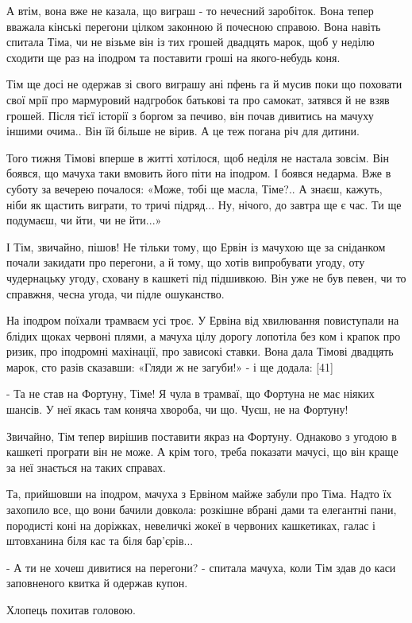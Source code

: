 А втім, вона вже не казала, що виграш - то нечесний заробіток. Вона тепер вважала кінські перегони цілком законною й почесною справою. Вона навіть спитала Тіма, чи не візьме він із тих грошей двадцять марок, щоб у неділю сходити ще раз на іподром та поставити гроші на якого-небудь коня.

Тім ще досі не одержав зі свого виграшу ані пфень га й мусив поки що поховати свої мрії про мармуровий надгробок батькові та про самокат, затявся й не взяв грошей. Після тієї історії з боргом за печиво, він почав дивитись на мачуху іншими очима.. Він їй більше не вірив. А це теж погана річ для дитини.

Того тижня Тімові вперше в житті хотілося, щоб неділя не настала зовсім. Він боявся, що мачуха таки вмовить його піти на іподром. І боявся недарма. Вже в суботу за вечерею почалося: «Може, тобі ще масла, Тіме?.. А знаєш, кажуть, ніби як щастить виграти, то тричі підряд... Ну, нічого, до завтра ще є час. Ти ще подумаєш, чи йти, чи не йти...»

І Тім, звичайно, пішов! Не тільки тому, що Ервін із мачухою ще за сніданком почали закидати про перегони, а й тому, що хотів випробувати угоду, оту чудернацьку угоду, сховану в кашкеті під підшивкою. Він уже не був певен, чи то справжня, чесна угода, чи підле ошуканство.

На іподром поїхали трамваєм усі троє. У Ервіна від хвилювання повиступали на блідих щоках червоні плями, а мачуха цілу дорогу лопотіла без ком і крапок про ризик, про іподромні махінації, про зависокі ставки. Вона дала Тімові двадцять марок, сто разів сказавши: «Гляди ж не загуби!» - і ще додала: [41]

- Та не став на Фортуну, Тіме! Я чула в трамваї, що Фортуна не має ніяких шансів. У неї якась там коняча хвороба, чи що. Чуєш, не на Фортуну!

Звичайно, Тім тепер вирішив поставити якраз на Фортуну. Однаково з угодою в кашкеті програти він не може. А крім того, треба показати мачусі, що він краще за неї знається на таких справах.

Та, прийшовши на іподром, мачуха з Ервіном майже забули про Тіма. Надто їх захопило все, що вони бачили довкола: розкішне вбрані дами та елегантні пани, породисті коні на доріжках, невеличкі жокеї в червоних кашкетиках, галас і штовханина біля кас та біля бар'єрів...

- А ти не хочеш дивитися на перегони? - спитала мачуха, коли Тім здав до каси заповненого квитка й одержав купон.

Хлопець похитав головою.

